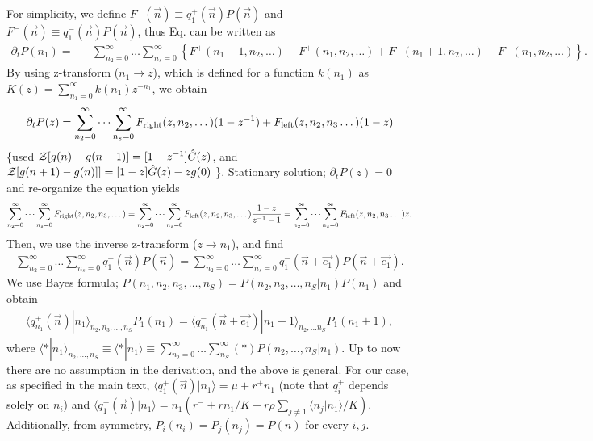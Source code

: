 \documentclass[9pt,twoside,lineno]{pnas-new}
\begin{document}
For simplicity, we define $F^{+}(\vec{n})\equiv q_1^+(\vec{n})P(\vec{n})$ and $F^{-}(\vec{n})\equiv q_1^-(\vec{n})P(\vec{n})$, thus Eq. 
can be written as 
\begin{eqnarray}
    \partial_t P(n_1) =&& \sum_{n_2=0}^{\infty}\dots \sum_{n_s=0}^{\infty} \left\{ F^{+}(n_1-1,n_2,\dots)-F^{+}(n_1,n_2,\dots)
     +F^{-}(n_1+1,n_2,\dots)-F^{-}(n_1,n_2,\dots) \right\}.
\end{eqnarray}
By using z-transform ($n_1\rightarrow z$), which is defined for a function $k(n_1)$ as $K(z)=\sum_{n_1=0}^{\infty} k(n_1) z^{-n_1} $, we obtain
\begin{eqnarray}
    \partial_t P(z) = \sum_{n_2=0}^{\infty}\dots \sum_{n_s=0}^{\infty} F_{\rm right}(z,n_2,\dots)(1-z^{-1})+F_{\rm left}(z,n_2,n_3\dots)(1-z) 
\end{eqnarray}
\{used ${\cal Z}[g(n)-g(n-1)]=[1-z^{-1}]\hat{G}(z)$, and ${\cal Z}[g(n+1)-g(n)]]=[1-z]\hat{G}(z)-zg(0)$ \}. Stationary solution; $\partial_t P(z)=0 $ and re-organize the equation yields 
\begin{eqnarray}
     \sum_{n_2=0}^{\infty}\dots \sum_{n_s=0}^{\infty}F_{\rm right}(z,n_2,n_3,\dots)=\sum_{n_2=0}^{\infty}\dots \sum_{n_s=0}^{\infty} F_{\rm left}(z,n_2,n_3,\dots)\frac{1-z}{z^{-1}-1}=\sum_{n_2=0}^{\infty}\dots \sum_{n_s=0}^{\infty}F_{\rm left}(z,n_2,n_3\dots)z .
\end{eqnarray}
Then, we use the inverse z-transform ($z\rightarrow n_1$), and find
\begin{eqnarray}
      \sum_{n_2=0}^{\infty}\dots \sum_{n_s=0}^{\infty}q^+_{1}(\vec{n})P(\vec{n})= \sum_{n_2=0}^{\infty}\dots \sum_{n_s=0}^{\infty}q^-_{1}(\vec{n}+\vec{e_1})P(\vec{n}+\vec{e_1}). 
\end{eqnarray}
We use Bayes formula; $P(n_1,n_2,n_3,\dots,n_S)=P(n_2,n_3,\dots, n_S|n_1)P(n_1)$ and obtain
\begin{eqnarray}
     \langle q_{n_1}^+(\vec{n})|n_1\rangle_{n_2,n_3,\dots,n_S}P_1(n_1) = \langle q_{n_1}^-(\vec{n}+\vec{e_1}) |n_1+1\rangle_{n_2,\dots n_S} P_1(n_1+1), 
\end{eqnarray}
where $ \langle *|n_1\rangle_{n_2, \dots, n_S}\equiv\langle *|n_1\rangle \equiv\sum_{n_2=0}^{\infty}\dots \sum_{n_S}^{\infty} (*)P(n_2, \dots, n_S|n_1) $. 
Up to now there are no assumption in the derivation, and the above is general. For our case, as specified in the main text,  $\langle q_{1}^+(\vec{n})|n_1\rangle=\mu + r^+ n_1$ (note that $q^+_{i}$ depends solely on $n_i$) and $\langle q_{1}^-(\vec{n})|n_1\rangle=n_1\left(r^-+r n_1/K + r \rho \sum_{j\neq 1 }\langle n_j |n_1\rangle /K \right)$.  Additionally, from symmetry,  $P_i(n_i)=P_j(n_j) = P(n)$ for every $i,j$.
\end{document}
